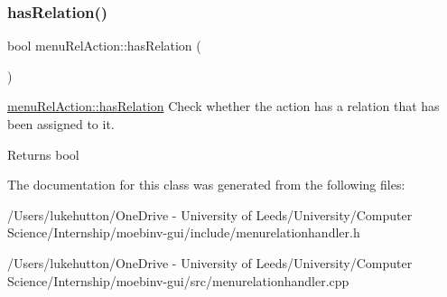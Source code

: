 \subsubsection{\texorpdfstring{has\+Relation()}{hasRelation()}}
{\footnotesize\ttfamily bool menu\+Rel\+Action\+::has\+Relation (\begin{DoxyParamCaption}{ }\end{DoxyParamCaption})}



\mbox{\hyperlink{classmenu_rel_action_a5e6339dbaf4cf0dc9543afdfc5b9e15a}{menu\+Rel\+Action\+::has\+Relation}} Check whether the action has a relation that has been assigned to it. 

\begin{DoxyReturn}{Returns}
bool 
\end{DoxyReturn}


The documentation for this class was generated from the following files\+:\begin{DoxyCompactItemize}
\item 
/\+Users/lukehutton/\+One\+Drive -\/ University of Leeds/\+University/\+Computer Science/\+Internship/moebinv-\/gui/include/menurelationhandler.\+h\item 
/\+Users/lukehutton/\+One\+Drive -\/ University of Leeds/\+University/\+Computer Science/\+Internship/moebinv-\/gui/src/menurelationhandler.\+cpp\end{DoxyCompactItemize}
